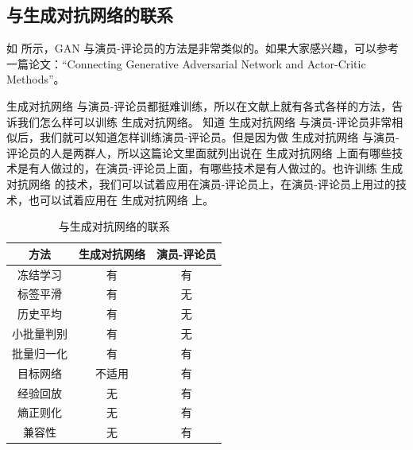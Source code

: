 \subsection{与生成对抗网络的联系} 

如 所示，GAN 与演员-评论员的方法是非常类似的。如果大家感兴趣，可以参考一篇论文：“Connecting Generative Adversarial Network and Actor-Critic Methods”。

生成对抗网络 与演员-评论员都挺难训练，所以在文献上就有各式各样的方法，告诉我们怎么样可以训练 生成对抗网络。
知道 生成对抗网络 与演员-评论员非常相似后，我们就可以知道怎样训练演员-评论员。但是因为做 生成对抗网络 与演员-评论员的人是两群人，所以这篇论文里面就列出说在 生成对抗网络 上面有哪些技术是有人做过的，在演员-评论员上面，有哪些技术是有人做过的。也许训练 生成对抗网络 的技术，我们可以试着应用在演员-评论员上，在演员-评论员上用过的技术，也可以试着应用在 生成对抗网络 上。

\begin{table}[hbt]
  \caption{与生成对抗网络的联系}
  \label{tab:GAN_AC}
  \centering
  \begin{tabular}{ccc}
  \toprule
  方法    & 生成对抗网络 & 演员-评论员 \\ \hline
  冻结学习  & 有      &  有    \\ 
  标签平滑  & 有     & 无      \\
  历史平均  &  有    & 无     \\ 
  小批量判别 &  有    & 无      \\ 
  批量归一化 &  有   &  有    \\ 
  目标网络  & 不适用    & 有      \\ 
  经验回放  & 无      & 有     \\ 
  熵正则化  & 无      & 有    \\ 
  兼容性   & 无      &  有   \\ 
  \bottomrule
  \end{tabular}
  \end{table}






